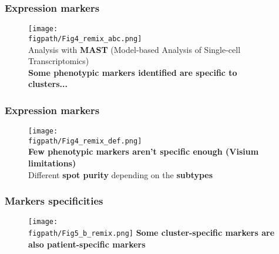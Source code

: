 \documentclass[aspectratio=169]{beamer}
\newcommand{\figpath}{/mnt/datadisk/Jordan/Delivrables/Rapports/Rapport_stage/Figures/Sans_légendes}
\begin{document}
\begin{frame}
	\frametitle<presentation>{Expression markers}
	\begin{figure}
		\centering
			\texttt{[image: \\figpath/Fig4\_remix\_abc.png]}\\
            \centering
            Analysis with \textbf{MAST} (Model-based Analysis of Single-cell Transcriptomics)\\
            \textbf{Some phenotypic markers identified are specific to clusters...}
		\label{fig:4bis1}
	\end{figure}
\end{frame}

\begin{frame}
	\frametitle<presentation>{Expression markers}
	\begin{figure}
		\centering
			\texttt{[image: \\figpath/Fig4\_remix\_def.png]}\\
            \centering
            \textbf{Few phenotypic markers aren't specific  enough (Visium limitations)}\\
            Different \textbf{spot purity} depending on the \textbf{subtypes}
		\label{fig:4bis2}
	\end{figure}
\end{frame}

\begin{comment}
\begin{frame}
	\frametitle<presentation>{Markers specificities}
	\begin{figure}
		\centering
			\texttt{[image: \\figpath/Fig5\_a.png]}
            \centering
            \textbf{Some markers seems to be overexpressed only in specific clusters...}\\
		\label{fig:dotplot_clusters}
	\end{figure}
\end{frame}
\end{comment}

\begin{frame}
	\frametitle<presentation>{Markers specificities}
	\begin{figure}
		\centering
			\texttt{[image: \\figpath/Fig5\_b\_remix.png]}
            \centering
            \textbf{Some cluster-specific markers are also patient-specific markers}
		\label{fig:dotplot_clusters2}
	\end{figure}
\end{frame}
\end{document}
